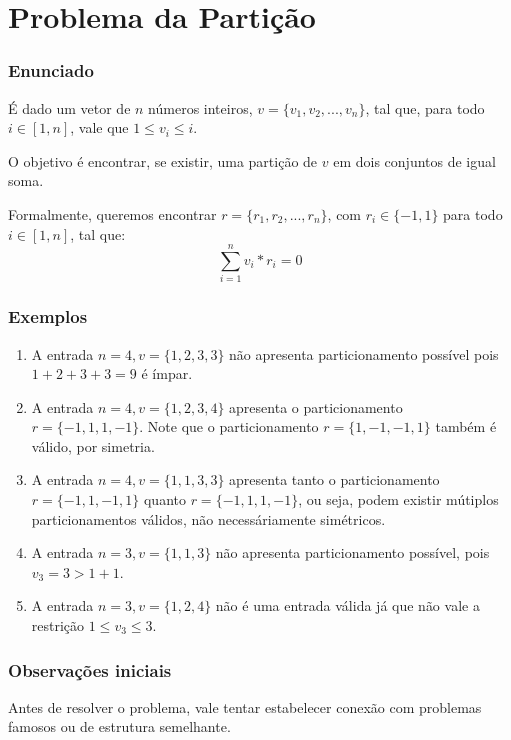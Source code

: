 \chapter{Problema da Partição}
\label{particao}

\subsection*{Enunciado}

É dado um vetor de $n$ números inteiros, $v = \{v_1, v_2, ..., v_n\}$, tal que, para todo $i \in [1, n]$, vale que $1 \leq v_i \leq i$.

O objetivo é encontrar, se existir, uma partição de $v$ em dois conjuntos de igual soma.

Formalmente, queremos encontrar $r = \{r_1, r_2, ..., r_n\}$, com $r_i \in \{-1, 1\}$ para todo $i \in [1, n]$, tal que:
$$\sum_{i = 1}^n v_i*r_i = 0$$

\subsection*{Exemplos}

\begin{enumerate}
    \item A entrada $n = 4, v = \{1, 2, 3, 3\}$ não apresenta particionamento possível pois $1 + 2 + 3 + 3 = 9$ é ímpar.
    \item A entrada $n = 4, v = \{1, 2, 3, 4\}$ apresenta o particionamento $r = \{-1, 1, 1, -1\}$. Note que o particionamento $r = \{1, -1, -1, 1\}$ também é válido, por simetria.
    \item A entrada $n = 4, v = \{1, 1, 3, 3\}$ apresenta tanto o particionamento $r = \{-1, 1, -1, 1\}$ quanto $r = \{-1, 1, 1, -1\}$, ou seja, podem existir mútiplos particionamentos válidos, não necessáriamente simétricos.
    \item A entrada $n = 3, v = \{1, 1, 3\}$ não apresenta particionamento possível, pois $v_3 = 3 > 1 + 1$.
    \item A entrada $n = 3, v = \{1, 2, 4\}$ não é uma entrada válida já que não vale a restrição $1 \leq v_3 \leq 3$.
\end{enumerate}

\subsection*{Observações iniciais}

Antes de resolver o problema, vale tentar estabelecer conexão com problemas famosos ou de estrutura semelhante.

